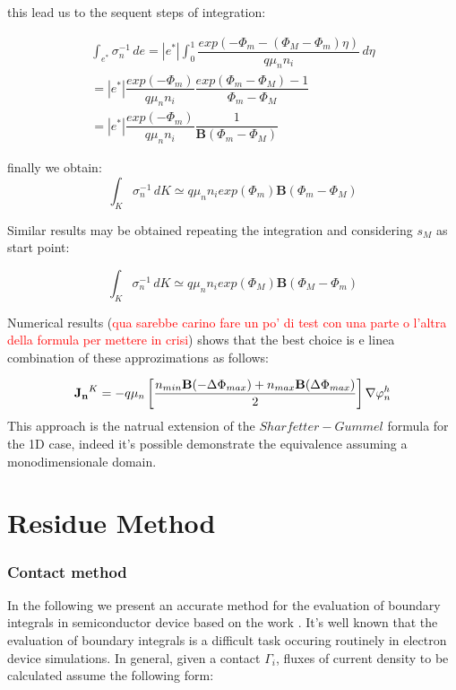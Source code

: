 this lead us to the sequent steps of integration:

\begin{multline*}
\int_{e^*} \sigma_n^{-1} \, de = |e^*| \int_0^1 \dfrac{exp \left(-\Phi_m - (\Phi_M-\Phi_m)\eta \right)}{q\mu_n n_i} 
 \, d\eta \\
 = |e^*|\dfrac{exp (-\Phi_m)}{q\mu_n n_i} \dfrac{exp ( \Phi_m-\Phi_M)-1}{\Phi_m-\Phi_M} \\
 =  |e^*|\dfrac{exp (-\Phi_m)}{q\mu_n n_i} \dfrac{1}{\mathbf{B}(\Phi_m-\Phi_M)}
\end{multline*}

finally we obtain:
\begin{equation}
\label{eq: finally approzimation 3D to 1D}
\int_{K} \sigma_n^{-1} \, dK \simeq  q \mu_n n_i exp(\Phi_m) \mathbf{B}(\Phi_m-\Phi_M)
\end{equation}

Similar results may be obtained repeating the integration and considering $s_M$ as start point:

\begin{equation}
\int_{K} \sigma_n^{-1} \, dK \simeq  q \mu_n n_i exp(\Phi_M) \mathbf{B}(\Phi_M-\Phi_m)
\end{equation}

Numerical results (\textcolor{red}{qua sarebbe carino fare un po' di test con una parte o l'altra della formula per mettere in crisi}) shows that the best choice is e linea combination of these approzimations as follows:

\begin{equation}
\label{eq: first formula for J}
\mathbf{J_n}^K = -  q \mu_n  \left[ \dfrac{ n_{min} \mathbf{B}(-\Delta \Phi_{max})  + n_{max}\mathbf{B}(\Delta \Phi_{max})}{2} \right]\nabla \varphi_n^h
\end{equation}
This approach is the natrual extension of the $Sharfetter-Gummel$ formula for the 1D case, indeed it's possible demonstrate the equivalence assuming a monodimensionale domain.




\section{Residue Method}
\subsubsection{Contact method}
In the following we present an accurate method for the evaluation of boundary integrals in semiconductor device based on the work .
It's well known that the evaluation of boundary integrals is a difficult task occuring routinely in electron device simulations. In general, given a contact $\Gamma_i$, fluxes of current density to be calculated assume the following form:

